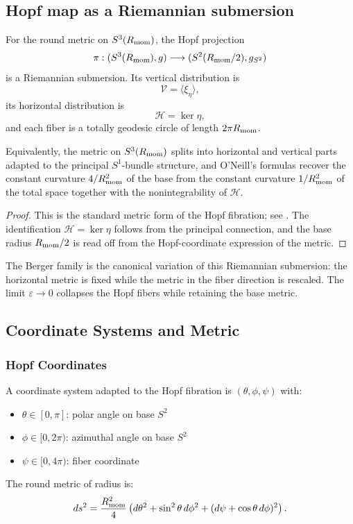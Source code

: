 \documentclass[11pt]{article}
\begin{document}
\subsection{Hopf map as a Riemannian submersion}
\label{p1:der:riemannian-submersion}

\begin{theorem}
\label{p1a:theorem:atlas-hopf-map-as-a-riemannian-submersion-b3988b5}

For the round metric on \(S^3(R_{\mathrm{mom}})\), the Hopf projection
\[
\pi:(S^3(R_{\mathrm{mom}}),g)\longrightarrow (S^2(R_{\mathrm{mom}}/2),g_{S^2})
\]
is a Riemannian submersion. Its vertical distribution is
\[
\mathcal V=\langle \xi_\eta\rangle,
\]
its horizontal distribution is
\[
\mathcal H=\ker\eta,
\]
and each fiber is a totally geodesic circle of length \(2\pi R_{\mathrm{mom}}\).

Equivalently, the metric on \(S^3(R_{\mathrm{mom}})\) splits into horizontal and vertical parts
adapted to the principal \(S^1\)-bundle structure, and O'Neill's formulas recover the
constant curvature \(4/R_{\mathrm{mom}}^2\) of the base from the constant curvature \(1/R_{\mathrm{mom}}^2\)
of the total space together with the nonintegrability of \(\mathcal H\).
\end{theorem}

\begin{proof}
This is the standard metric form of the Hopf fibration; see
\cite{besse1987einstein,warner1983foundations}. The identification
\(\mathcal H=\ker\eta\) follows from the principal connection, and the base radius
\(R_{\mathrm{mom}}/2\) is read off from the Hopf-coordinate expression of the metric.
\end{proof}

\begin{remark}
The Berger family is the canonical variation of this Riemannian submersion:
the horizontal metric is fixed while the metric in the fiber direction is rescaled.
The limit \(\varepsilon\to0\) collapses the Hopf fibers while retaining the base metric.
\end{remark}

\subsection{Coordinate Systems and Metric}
\label{p1:subsec:coordinates-metric}

\subsubsection{Hopf Coordinates}
A coordinate system adapted to the Hopf fibration is $(\theta, \phi, \psi)$ with:
\begin{itemize}
\item $\theta \in [0,\pi]$: polar angle on base $S^2$
\item $\phi \in [0,2\pi)$: azimuthal angle on base $S^2$  
\item $\psi \in [0,4\pi)$: fiber coordinate
\end{itemize}
The round metric of radius \Rmom is:
\[
ds^2 = \frac{R_{\mathrm{mom}}^2}{4}\left(d\theta^2 + \sin^2\theta\, d\phi^2 + (d\psi + \cos\theta\, d\phi)^2\right).
\]
\end{document}
